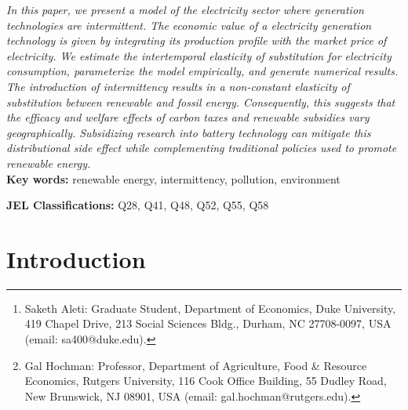 \documentclass[11pt,a4paper,leqno]{extarticle}
\begin{document}
	
	\title{}
	
	\author[]{Saketh Aleti\thanks{Saketh Aleti: Graduate Student, Department of Economics, Duke University, 419 Chapel Drive, 213 Social Sciences Bldg., Durham, NC 27708-0097, USA (email: sa400@duke.edu).}  \, and  Gal Hochman\thanks{ Gal Hochman: Professor, Department of Agriculture, Food \& Resource Economics, Rutgers University, 116 Cook Office Building, 55 Dudley Road, New Brunswick, NJ 08901, USA (email: gal.hochman@rutgers.edu).}}
	
	
	\maketitle
	
	\begin{addmargin}[0.5in]{0.5in}
		\textit{In this paper, we present a model of the electricity sector where generation technologies are intermittent. The economic value of a electricity generation technology is given by integrating its production profile with the market price of electricity. We estimate the intertemporal elasticity of substitution for electricity consumption,  parameterize the model empirically, and generate numerical results. The introduction of intermittency results in a non-constant elasticity of substitution between renewable and fossil energy. Consequently, this suggests that the efficacy and welfare effects of carbon taxes and renewable subsidies vary geographically. Subsidizing research into battery technology can mitigate this distributional side effect while complementing traditional policies used to promote renewable energy. 
		}
		\\
		\noindent\textbf{Key words:} renewable energy, intermittency, pollution, environment
		
		\noindent\textbf{JEL Classifications:} Q28, Q41, Q48, Q52, Q55, Q58
	\end{addmargin}
	
	
	
	
	
	
	\section{Introduction}
	
\end{document}
